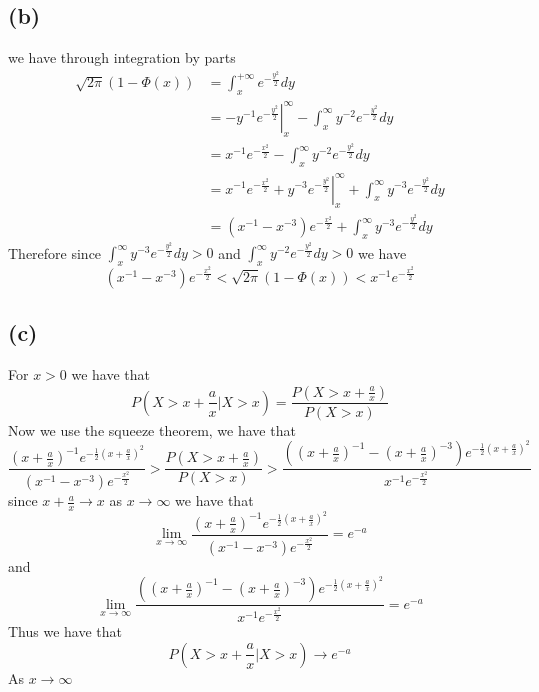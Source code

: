 \subsection*{(b)}
we have through integration by parts
\begin{align*}
    \sqrt{2\pi}(1-\Phi(x))&=\int_{x}^{+\infty}e^{-\frac{y^2}{2}}dy\\
    &=\left.-y^{-1}e^{-\frac{y^2}{2}}\right|_{x}^{\infty}-\int_{x}^{\infty}y^{-2}e^{-\frac{y^2}{2}}dy\\
    &=x^{-1}e^{-\frac{x^2}{2}}-\int_{x}^{\infty}y^{-2}e^{-\frac{y^2}{2}}dy\\
    &= x^{-1}e^{-\frac{x^2}{2}}+\left.y^{-3}e^{-\frac{y^2}{2}}\right|_{x}^{\infty}+\int_{x}^{\infty}y^{-3}e^{-\frac{y^2}{2}}dy\\
    &=(x^{-1}-x^{-3})e^{-\frac{x^2}{2}}+\int_{x}^{\infty}y^{-3}e^{-\frac{y^2}{2}}dy
\end{align*}
Therefore since $\int_{x}^{\infty}y^{-3}e^{-\frac{y^2}{2}}dy>0$ and $\int_{x}^{\infty}y^{-2}e^{-\frac{y^2}{2}}dy> 0$ we have
$$(x^{-1}-x^{-3})e^{-\frac{x^2}{2}}<\sqrt{2\pi}(1-\Phi(x))<x^{-1}e^{-\frac{x^2}{2}}$$
\subsection*{(c)}
For $x>0$ we have that 
$$P(X>x+\frac{a}{x}|X>x)=\frac{P(X>x+\frac{a}{x})}{P(X>x)}$$
Now we use the squeeze theorem, we have that 
$$\frac{\left(x+\frac{a}{x}\right)^{-1}e^{-\frac{1}{2}(x+\frac{a}{x})^2}}
{(x^{-1}-x^{-3})e^{-\frac{x^2}{2}}}
>\frac{P(X>x+\frac{a}{x})}{P(X>x)}>
\frac{\left(\left(x+\frac{a}{x}\right)^{-1}-
\left(x+\frac{a}{x}\right)^{-3}\right)e^{-\frac{1}{2}(x+\frac{a}{x})^2}}
    {x^{-1}e^{-\frac{x^2}{2}}}$$
since $x+\frac{a}{x}\to x$ as $x\to\infty$ we have that 
$$\lim_{x\to\infty}\frac{\left(x+\frac{a}{x}\right)^{-1}e^{-\frac{1}{2}(x+\frac{a}{x})^2}}
{(x^{-1}-x^{-3})e^{-\frac{x^2}{2}}}=e^{-a}$$
and
$$\lim_{x\to\infty}\frac{\left(\left(x+\frac{a}{x}\right)^{-1}-
\left(x+\frac{a}{x}\right)^{-3}\right)e^{-\frac{1}{2}(x+\frac{a}{x})^2}}
    {x^{-1}e^{-\frac{x^2}{2}}}=e^{-a}$$
Thus we have that 
$$P\left(X>x+\frac{a}{x}|X>x\right)\to e^{-a}$$
As $x\to\infty$ 

